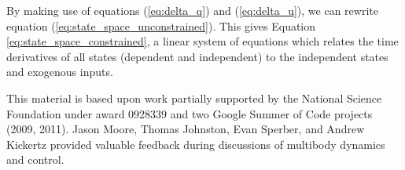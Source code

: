 \documentclass[smallcondensed]{svjour3}                     %
\begin{document}
By making use of equations (\ref{eq:delta_q}) and (\ref{eq:delta_u}), we can
rewrite equation (\ref{eq:state_space_unconstrained}).  This gives Equation
\ref{eq:state_space_constrained}, a linear system of equations which relates
the time derivatives of all states (dependent and independent) to the
independent states and exogenous inputs.

\begin{acknowledgements}
  This material is based upon work partially supported by the National Science
  Foundation under award 0928339 and two Google Summer of Code projects (2009,
  2011).  Jason Moore, Thomas Johnston, Evan Sperber, and Andrew Kickertz
  provided valuable feedback during discussions of multibody dynamics and
  control.
\end{acknowledgements}

\end{document}
